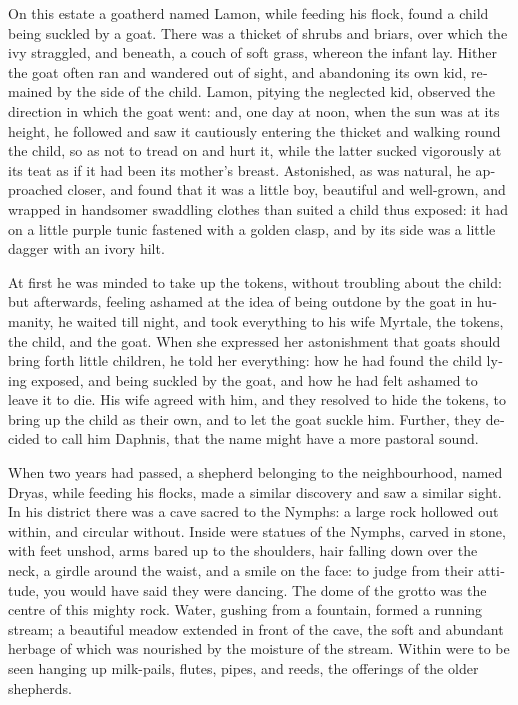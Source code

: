 \documentclass{book}
\begin{document}
\begin{pairs}
\begin{Rightside}
\begin{english}
  On this estate a goatherd named Lamon, while feeding his flock, found a child being suckled by a goat.  There was a thicket of shrubs and briars, over which the ivy straggled, and beneath, a couch of soft grass, whereon the infant lay.  Hither the goat often ran and wandered out of sight, and abandoning its own kid, remained by the side of the child.  Lamon, pitying the neglected kid, observed the direction in which the goat went: and, one day at noon, when the sun was at its height, he followed and saw it cautiously entering the thicket and walking round the child, so as not to tread on and hurt it, while the latter sucked vigorously at its teat as if it had been its mother's breast.  Astonished, as was natural, he approached closer, and found that it was a little boy, beautiful and well-grown, and wrapped in handsomer swaddling clothes than suited a child thus exposed: it had on a little purple tunic fastened with a golden clasp, and by its side was a little dagger with an ivory hilt.
\pend


  At first he was minded to take up the tokens, without troubling about the child: but afterwards, feeling ashamed at the idea of being outdone by the goat in humanity, he waited till night, and took everything to his wife Myrtale, the tokens, the child, and the goat.  When she expressed her astonishment that goats should bring forth little children, he told her everything: how he had found the child lying exposed, and being suckled by the goat, and how he had felt ashamed to leave it to die.  His wife agreed with him, and they resolved to hide the tokens, to bring up the child as their own, and to let the goat suckle him.  Further, they decided to call him Daphnis, that the name might have a more pastoral sound.
\pend


  When two years had passed, a shepherd belonging to the neighbourhood, named Dryas, while feeding his flocks, made a similar discovery and saw a similar sight.  In his district there was a cave sacred to the Nymphs: a large rock hollowed out within, and circular without.  Inside were statues of the Nymphs, carved in stone, with feet unshod, arms bared up to the shoulders, hair falling down over the neck, a girdle around the waist, and a smile on the face: to judge from their attitude, you would have said they were dancing.  The dome of the grotto was the centre of this mighty rock.  Water, gushing from a fountain, formed a running stream; a beautiful meadow extended in front of the cave, the soft and abundant herbage of which was nourished by the moisture of the stream.  Within were to be seen hanging up milk-pails, flutes, pipes, and reeds, the offerings of the older shepherds.
\pend



\end{english}
\end{Rightside}
\end{pairs}
\end{document}
